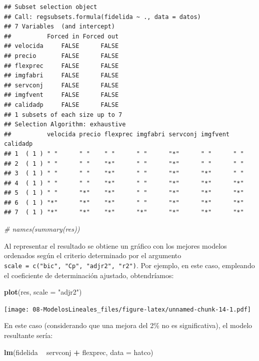 \documentclass[]{book}
\newenvironment{Shaded}{\begin{snugshade}}{\end{snugshade}}
\newcommand{\KeywordTok}[1]{\textcolor[rgb]{0.13,0.29,0.53}{\textbf{#1}}}
\newcommand{\DataTypeTok}[1]{\textcolor[rgb]{0.13,0.29,0.53}{#1}}
\newcommand{\StringTok}[1]{\textcolor[rgb]{0.31,0.60,0.02}{#1}}
\newcommand{\CommentTok}[1]{\textcolor[rgb]{0.56,0.35,0.01}{\textit{#1}}}
\newcommand{\OperatorTok}[1]{\textcolor[rgb]{0.81,0.36,0.00}{\textbf{#1}}}
\newcommand{\NormalTok}[1]{#1}
\begin{document}
\begin{verbatim}
## Subset selection object
## Call: regsubsets.formula(fidelida ~ ., data = datos)
## 7 Variables  (and intercept)
##          Forced in Forced out
## velocida     FALSE      FALSE
## precio       FALSE      FALSE
## flexprec     FALSE      FALSE
## imgfabri     FALSE      FALSE
## servconj     FALSE      FALSE
## imgfvent     FALSE      FALSE
## calidadp     FALSE      FALSE
## 1 subsets of each size up to 7
## Selection Algorithm: exhaustive
##          velocida precio flexprec imgfabri servconj imgfvent calidadp
## 1  ( 1 ) " "      " "    " "      " "      "*"      " "      " "     
## 2  ( 1 ) " "      " "    "*"      " "      "*"      " "      " "     
## 3  ( 1 ) " "      " "    "*"      " "      "*"      "*"      " "     
## 4  ( 1 ) " "      " "    "*"      " "      "*"      "*"      "*"     
## 5  ( 1 ) " "      "*"    "*"      " "      "*"      "*"      "*"     
## 6  ( 1 ) "*"      "*"    "*"      " "      "*"      "*"      "*"     
## 7  ( 1 ) "*"      "*"    "*"      "*"      "*"      "*"      "*"
\end{verbatim}

\begin{Shaded}
\begin{Highlighting}[]
\CommentTok{# names(summary(res))}
\end{Highlighting}
\end{Shaded}

Al representar el resultado se obtiene un gráfico con los mejores
modelos ordenados según el criterio determinado por el argumento
\texttt{scale\ =\ c("bic",\ "Cp",\ "adjr2",\ "r2")}. Por ejemplo, en
este caso, empleando el coeficiente de determinación ajustado,
obtendríamos:

\begin{Shaded}
\begin{Highlighting}[]
\KeywordTok{plot}\NormalTok{(res, }\DataTypeTok{scale =} \StringTok{"adjr2"}\NormalTok{)}
\end{Highlighting}
\end{Shaded}

\texttt{[image: 08-ModelosLineales\_files/figure-latex/unnamed-chunk-14-1.pdf]}

En este caso (considerando que una mejora del 2\% no es significativa),
el modelo resultante sería:

\begin{Shaded}
\begin{Highlighting}[]
\KeywordTok{lm}\NormalTok{(fidelida }\OperatorTok{~}\StringTok{ }\NormalTok{servconj }\OperatorTok{+}\StringTok{ }\NormalTok{flexprec, }\DataTypeTok{data =}\NormalTok{ hatco)}
\end{Highlighting}
\end{Shaded}
\end{document}
